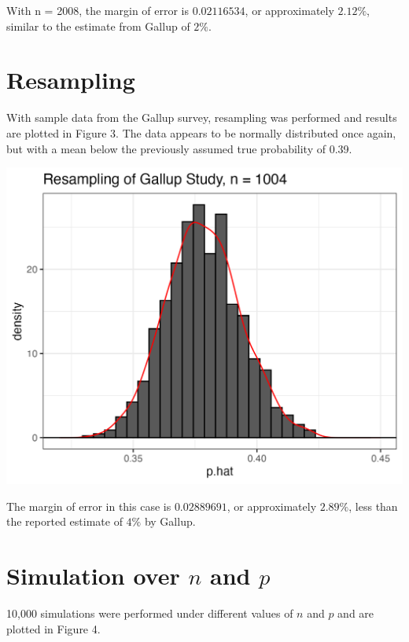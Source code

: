 \documentclass{article}\usepackage[]{graphicx}\usepackage[]{xcolor}
\newenvironment{Figure}
  {\par\medskip\noindent\minipage{\linewidth}}
  {\endminipage\par\medskip}
\begin{document}
\begin{multicols}{2}
With n = 2008, the margin of error is $0.02116534$, or approximately $2.12\%$, similar to the estimate from Gallup of $2\%$.

\section{Resampling}

With sample data from the Gallup survey, resampling was performed and results are plotted in Figure 3. The data appears to be normally distributed once again, but with a mean below the previously assumed true probability of 0.39.

\begin{Figure}
\begin{center}
  \includegraphics[width=\textwidth]{task2.png}
\end{center} 
\end{Figure}

The margin of error in this case is $0.02889691$, or approximately $2.89\%$, less than the reported estimate of $4\%$ by Gallup.

\section{Simulation over $n$ and $p$}

10,000 simulations were performed under different values of $n$ and $p$ and are plotted in Figure 4.


\end{multicols}
\end{document}
